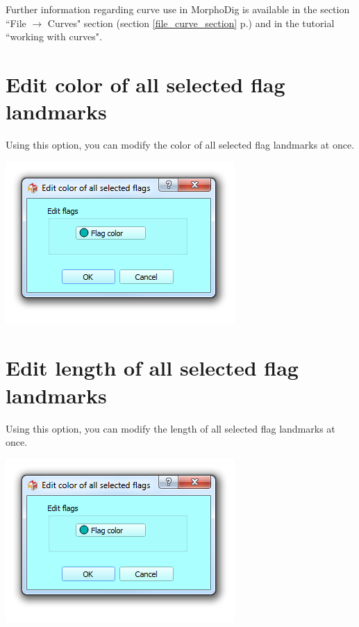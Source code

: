 \noindent Further information regarding curve use in MorphoDig is available in the section ``File $\rightarrow$
Curves" section (section \ref{file_curve_section} p.\pageref{file_curve_section}) and in the tutorial ``working with curves".

\section{Edit color of all selected flag landmarks}
\noindent
\begin{minipage}{0.5\textwidth}
Using this option, you can modify the color of all selected flag landmarks at once.
\end{minipage}    
\begin{minipage}{0.5\textwidth}\centering
  \includegraphics[scale=0.5]{images/10/edit_color_all_selected_flags.png}
 \end{minipage} 


\section{Edit length of all selected flag landmarks}
\noindent
\begin{minipage}{0.5\textwidth}
Using this option, you can modify the length of all selected flag landmarks at once.
\end{minipage}    
\begin{minipage}{0.5\textwidth}\centering
  \includegraphics[scale=0.5]{images/10/edit_color_all_selected_flags.png}
 \end{minipage} 




